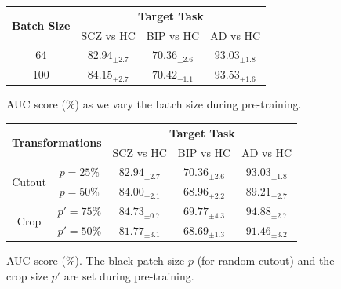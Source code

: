 \documentclass[runningheads]{llncs}
\begin{document}
\begin{figure}[h]
    \begin{minipage}[c]{.4\linewidth}
        \centering
        \begin{tabular}{|c|c|c|c|}
            \hline
            \multirow{2}{*}{\textbf{Batch Size}} & \multicolumn{3}{c|}{\textbf{Target Task}} \\
            \cline{2-4}
                                                 & SCZ vs HC & BIP vs HC & AD vs HC \\
            \hline
            64 & $82.94_{\pm 2.7}$ & $70.36_{\pm 2.6}$ & $93.03_{\pm1.8}$ \\ 
            100 & $84.15_{\pm 2.7}$ & $70.42_{\pm 1.1}$ & $93.53_{\pm1.6}$ \\
            \hline
        \end{tabular}
        \caption{AUC score (\%) as we vary the batch size during pre-training.}
        \label{batch_size_tab_supp}
    \end{minipage}
    \hfill%
    \begin{minipage}[c]{.4\linewidth}
        \centering
            \begin{tabular}{|c c|c|c|c|}
                \hline
                \multicolumn{2}{|c|}{\multirow{2}{*}{\textbf{Transformations}}} & \multicolumn{3}{c|}{\textbf{Target Task}} \\
                \cline{3-5}
                                                    & & SCZ vs HC & BIP vs HC & AD vs HC  \\
                \hline
                \multirow{2}{*}{Cutout} & $p=25\%$ & $82.94_{\pm2.7}$ & $70.36_{\pm2.6}$ & $93.03_{\pm1.8}$ \\ 
                                        & $p=50\%$ & $84.00_{\pm2.1}$ & $68.96_{\pm2.2}$ &  $89.21_{\pm2.7}$\\
                \hline
                \multirow{2}{*}{Crop} & $p'=75\%$ & $84.73_{\pm0.7}$ & $69.77_{\pm4.3}$ & $94.88_{\pm2.7}$\\ 
                                      & $p'=50\%$ & $81.77_{\pm3.1}$ & $68.69_{\pm 1.3}$ & $91.46_{\pm3.2}$\\
                \hline
            \end{tabular}
        \caption{AUC score (\%). The black patch size $p$ (for random cutout) and the crop size $p'$ are set during pre-training.} %
        \label{patch_size_tab_supp}
    \end{minipage}
\end{figure}
\end{document}
